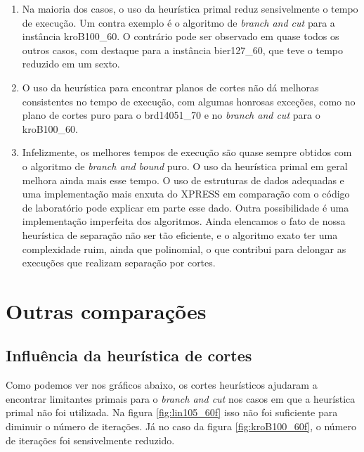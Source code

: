 \documentclass[11pt]{article}
\begin{document}
\begin{enumerate}
 \item Na maioria dos casos, o uso da heurística primal reduz
       sensivelmente o tempo de execução. Um contra exemplo é o
       algoritmo de \emph{branch and cut} para a instância
       kroB100\_60. O contrário pode ser observado em quase todos os
       outros casos, com destaque para a instância bier127\_60, que teve
       o tempo reduzido em um sexto. 
 \item O uso da heurística para encontrar planos de cortes não dá
       melhoras consistentes no tempo de execução, com algumas honrosas
       exceções, como no plano de cortes puro para o brd14051\_70 e no
       \emph{branch and cut} para o kroB100\_60.
 \item Infelizmente, os melhores tempos de execução são quase sempre
       obtidos com o algoritmo de \emph{branch and bound} puro. O uso da
       heurística primal em geral melhora ainda mais esse tempo. O uso
       de estruturas de dados adequadas e uma implementação mais enxuta
       do XPRESS em comparação com o código de laboratório pode explicar
       em parte esse dado. Outra possibilidade é uma implementação
       imperfeita dos algoritmos. Ainda elencamos o fato de nossa
       heurística de separação não ser tão eficiente, e o algoritmo
       exato ter uma complexidade ruim, ainda que polinomial, o que
       contribui para delongar as execuções que realizam separação por
       cortes. 
\end{enumerate}

\section{Outras comparações}

\subsection{Influência da heurística de cortes}

Como podemos ver nos gráficos abaixo, os cortes heurísticos ajudaram a
encontrar limitantes primais para o \emph{branch and cut} nos casos em
que a heurística primal não foi utilizada. Na figura
\ref{fig:lin105_60f} isso não foi suficiente para diminuir o número de
iterações. Já no caso da figura \ref{fig:kroB100_60f}, o número de
iterações foi sensivelmente reduzido.
\end{document}
